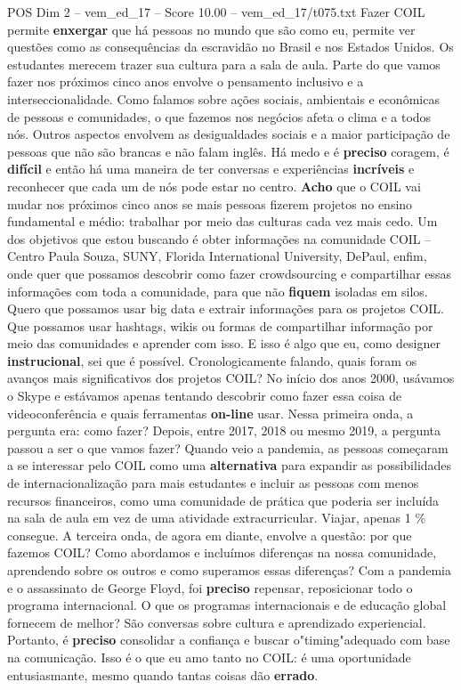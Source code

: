 \begin{textsample}{POS Dim 2 – vem\_ed\_17 – Score 10.00 – vem\_ed\_17/t075.txt}  \label{ex:f2_pos_122}
Fazer COIL permite \textbf{enxergar} que há pessoas no mundo que são como eu, permite ver questões como as consequências da escravidão no Brasil e nos Estados Unidos.
Os estudantes merecem trazer sua cultura para a sala de aula.
Parte do que vamos fazer nos próximos cinco anos envolve o pensamento inclusivo e a interseccionalidade.
Como falamos sobre ações sociais, ambientais e econômicas de pessoas e comunidades, o que fazemos nos negócios afeta o clima e a todos nós.
Outros aspectos envolvem as desigualdades sociais e a maior participação de pessoas que não são brancas e não falam inglês.
Há medo e é \textbf{preciso} coragem, é \textbf{difícil} e então há uma maneira de ter conversas e experiências \textbf{incríveis} e reconhecer que cada um de nós pode estar no centro. \textbf{Acho} que o COIL vai mudar nos próximos cinco anos se mais pessoas fizerem projetos no ensino fundamental e médio: trabalhar por meio das culturas cada vez mais cedo.
Um dos objetivos que estou buscando é obter informações na comunidade COIL – Centro Paula Souza, SUNY, Florida International University, DePaul, enfim, onde quer que possamos descobrir como fazer crowdsourcing e compartilhar essas informações com toda a comunidade, para que não \textbf{fiquem} isoladas em silos.
Quero que possamos usar big data e extrair informações para os projetos COIL.
Que possamos usar hashtags, wikis ou formas de compartilhar informação por meio das comunidades e aprender com isso.
E isso é algo que eu, como designer \textbf{instrucional}, sei que é possível.
Cronologicamente falando, quais foram os avanços mais significativos dos projetos COIL?
No início dos anos 2000, usávamos o Skype e estávamos apenas tentando descobrir como fazer essa coisa de videoconferência e quais ferramentas \textbf{on-line} usar.
Nessa primeira onda, a pergunta era: como fazer?
Depois, entre 2017, 2018 ou mesmo 2019, a pergunta passou a ser o que vamos fazer?
Quando veio a pandemia, as pessoas começaram a se interessar pelo COIL como uma \textbf{alternativa} para expandir as possibilidades de internacionalização para mais estudantes e incluir as pessoas com menos recursos financeiros, como uma comunidade de prática que poderia ser incluída na sala de aula em vez de uma atividade extracurricular.
Viajar, apenas 1 \% consegue.
A terceira onda, de agora em diante, envolve a questão: por que fazemos COIL?
Como abordamos e incluímos diferenças na nossa comunidade, aprendendo sobre os outros e como superamos essas diferenças?
Com a pandemia e o assassinato de George Floyd, foi \textbf{preciso} repensar, reposicionar todo o programa internacional.
O que os programas internacionais e de educação global fornecem de melhor?
São conversas sobre cultura e aprendizado experiencial.
Portanto, é \textbf{preciso} consolidar a confiança e buscar o"timing"adequado com base na comunicação.
Isso é o que eu amo tanto no COIL: é uma oportunidade entusiasmante, mesmo quando tantas coisas dão \textbf{errado}.

\end{textsample}
